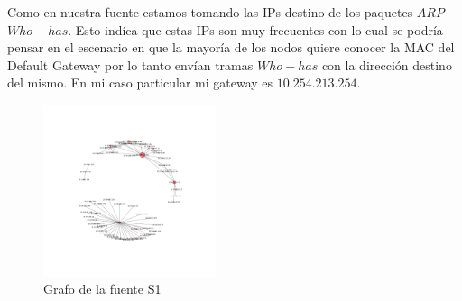 Como en nuestra fuente estamos tomando las IPs destino de los paquetes $ARP$ $Who-has$. Esto indíca que estas IPs son muy frecuentes con lo cual se podría pensar en el escenario en que la mayoría de los nodos quiere conocer la MAC del Default Gateway por lo tanto envían tramas $Who-has$ con la dirección destino del mismo. En mi caso particular mi gateway es $10.254.213.254$.


\begin{figure}[H]
  \centering
    \includegraphics[width=0.45\textwidth]{grafo_red_despegar.png}
  \caption{Grafo de la fuente S1}
  \label{grafo-s1}
\end{figure}
